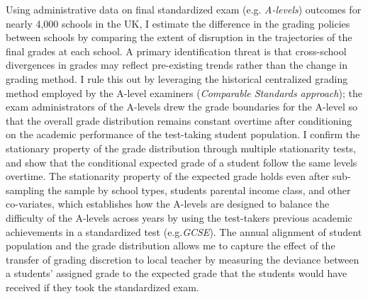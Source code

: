 Using administrative data on final standardized exam  (e.g. \emph{A-levels})  outcomes for nearly 4,000 schools in the UK, I estimate the difference in the grading policies between schools by comparing the extent of disruption in the trajectories of the final grades at each school. A primary identification threat is that cross-school divergences in grades may reflect pre-existing trends rather than the change in grading method. I rule this out by leveraging the historical centralized grading method employed by the A-level examiners (\emph{Comparable Standards approach}); the exam administrators of the A-levels drew the grade boundaries for the A-level so that the overall grade distribution remains constant overtime after conditioning on the academic performance of the test-taking student population. I confirm the stationary property of the grade distribution through multiple stationarity tests, and show that the conditional expected grade of a student follow the same levels overtime. The stationarity property of the expected grade holds even after sub-sampling the sample by school types, students parental income class, and other co-variates, which establishes how the A-levels are designed to balance the difficulty of the A-levels across years by using the test-takers previous academic achievements in a standardized test (e.g.\emph{GCSE}). The annual alignment of student population and the grade distribution allows me to capture the effect of the transfer of grading discretion to local teacher by measuring the deviance between a students' assigned grade to the expected grade that the students would have received if they took the standardized exam. 

